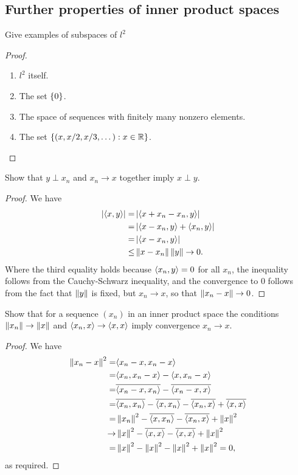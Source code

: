 \subsection{Further properties of inner product spaces}


\begin{exercise}{2}
Give examples of subspaces of $l^2$
\end{exercise}
\begin{proof}
\begin{enumerate}
    \item $l^2$ itself.
    \item The set $\{0\}$.
    \item The space of sequences with finitely many nonzero elements.
    \item The set $\{(x,x/2,x/3,\dots): x\in\mathbb{R}\}$.
\end{enumerate}
\end{proof}

\begin{exercise}{4}
Show that $y\perp x_n$ and $x_n\to x$ together imply $x\perp y$.
\end{exercise}
\begin{proof}
We have
\begin{align*}
    \left\lvert \langle x,y\rangle\right\rvert
    =& \left\lvert \langle x+x_n-x_n,y\rangle\right\rvert\\
    =& \left\lvert \langle x-x_n,y\rangle + \langle x_n,y\rangle\right\rvert\\
    =& \left\lvert \langle x-x_n,y\rangle\right\rvert\\
    \leq& \left\lVert x-x_n\right\rVert\left\lVert y\right\rVert\to 0.
\end{align*}
Where the third equality holds because $\langle x_n,y\rangle=0$ for all $x_n$, the inequality follows from the Cauchy-Schwarz inequality, and the convergence to 0 follows from the fact that $\left\lVert y\right\rVert$ is fixed, but $x_n\to x$, so that $\left\lVert x_n-x\right\rVert\to 0$.
\end{proof}

\begin{exercise}{5}
Show that for a sequence $(x_n)$ in an inner product space the conditions $\left\lVert x_n\right\rVert\to\left\lVert x\right\rVert$ and $\langle x_n,x\rangle\to\langle x,x\rangle$ imply convergence $x_n\to x$.
\end{exercise}
\begin{proof}
We have
\begin{align*}
    \left\lVert x_n-x\right\rVert^2
    =& \langle x_n-x, x_n-x\rangle\\
    =& \langle x_n,x_n-x\rangle - \langle x,x_n-x\rangle\\
    =& \overline{\langle x_n-x,x_n\rangle} - \overline{\langle x_n-x,x\rangle}\\
    =& \overline{\langle x_n,x_n\rangle} -\overline{\langle x,x_n\rangle} - \overline{\langle x_n,x\rangle} + \overline{\langle x,x\rangle}\\
    =& \left\lVert x_n\right\rVert^2 -\overline{\langle x,x_n\rangle} - \overline{\langle x_n,x\rangle} + \left\lVert x\right\rVert^2\\
    \to& \left\lVert x\right\rVert^2 -\overline{\langle x,x\rangle} - \overline{\langle x,x\rangle} + \left\lVert x\right\rVert^2\\
    =& \left\lVert x\right\rVert^2 - \left\lVert x\right\rVert^2 - \left\lVert x\right\rVert^2 + \left\lVert x\right\rVert^2 = 0,
\end{align*}
as required.
\end{proof}

